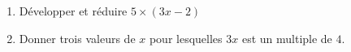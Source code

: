 
\begin{exercice}\label{exo2smath-0143}

    \begin{enumerate}
        \item
            Développer et réduire \( 5\times (3x-2)\)
        \item
            Donner trois valeurs de \( x\) pour lesquelles \( 3x\) est un multiple de \( 4\).
    \end{enumerate}

\end{exercice}
